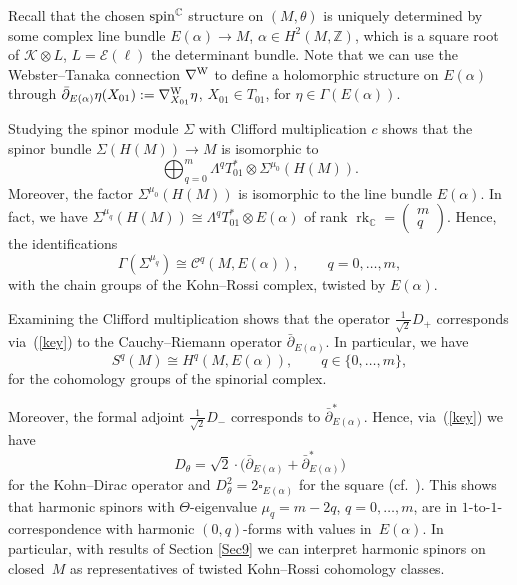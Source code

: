 \documentclass[pdftex]{sigma}
\numberwithin{equation}{section}
\newcommand{\ZZ}{\mathbb{Z}}
\newcommand{\CC}{\mathbb{C}}
\begin{document}
Recall that the chosen ${\rm spin}^\CC$ structure on $(M,\theta)$ is
uniquely determined by some complex line bundle $E(\alpha)\to M$, $\alpha\in H^2(M,\ZZ)$, which is a square root of $\mathcal{K}\otimes L$,
$L=\mathcal{E}(\ell)$ the determinant bundle. Note that we can use the Webster--Tanaka connection $\nabla^{\rm W}$ to define a holomorphic
structure on $E(\alpha)$ through $\bar{\partial}_{E(\alpha)}\eta(X_{01}):=\nabla^{\rm W}_{X_{01}}\eta$, $X_{01}\in T_{01}$, for $\eta\in\Gamma(E(\alpha))$.

Studying the spinor module $\Sigma$ with Clifford multiplication $c$ shows that the spinor bundle $\Sigma(H(M))\to M$ is isomorphic to
\[
\bigoplus_{q=0}^m \Lambda^{q}T_{01}^* \otimes \Sigma^{\mu_0}(H(M)).
\]
Moreover, the factor $\Sigma^{\mu_0}(H(M))$ is isomorphic to the line bundle $E(\alpha)$. In fact, we have
$\Sigma^{\mu_q}(H(M))\cong \Lambda^{q}T_{01}^*\otimes E(\alpha)$ of rank
$\operatorname{rk}_\CC=\left( \begin{smallmatrix} m\\ q\end{smallmatrix}\right)$.
Hence, the identifications{\samepage
\begin{equation}\label{key}
\Gamma(\Sigma^{\mu_q}) \cong \mathcal{C}^q(M,E(\alpha)),\qquad q=0,\dots,m,
\end{equation}
with the chain groups of the Kohn--Rossi complex, twisted by $E(\alpha)$.}

Examining the Clifford multiplication shows that
the operator $\frac{1}{\sqrt{2}}D_+$ corresponds via~(\ref{key}) to the Cauchy--Riemann operator $\bar{\partial}_{E(\alpha)}$.
In particular, we have
\[
S^q(M) \cong H^q(M,E(\alpha)),\qquad q\in\{0,\dots,m\},
\]
for the cohomology groups of the spinorial complex.

Moreover, the formal adjoint $\frac{1}{\sqrt{2}}D_-$ corresponds to $\bar{\partial}^*_{E(\alpha)}$. Hence, via~(\ref{key})
we have
\[
D_\theta = \sqrt{2}\cdot \big(\bar{\partial}_{E(\alpha)} + \bar{\partial}^*_{E(\alpha)}\big)
\]
for  the Kohn--Dirac operator and $D^2_\theta =2\square_{E(\alpha)}$ for the square (cf.~\cite{Pet}). This shows that harmonic spinors with
$\Theta$-eigenvalue $\mu_q=m-2q$, $q=0,\dots,m$, are in $1$-to-$1$-correspondence with harmonic $(0,q)$-forms with values in~$E(\alpha)$.
In particular, with results of Section \ref{Sec9} we can interpret harmonic spinors on closed~$M$ as representatives of
twisted Kohn--Rossi cohomology classes.
\end{document}
